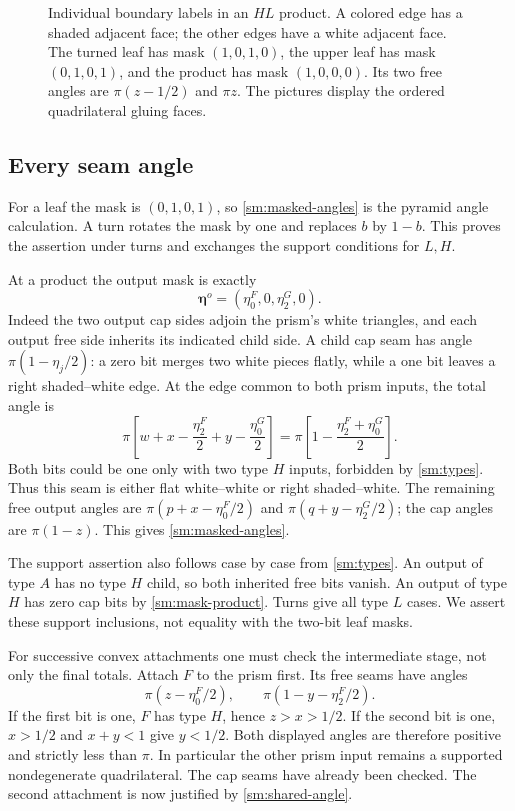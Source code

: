 \begin{figure}[ht]
\centering
\caption{Individual boundary labels in an $HL$ product. A colored
edge has a shaded adjacent face; the other edges have a white
adjacent face. The turned leaf has mask $(1,0,1,0)$, the upper
leaf has mask $(0,1,0,1)$, and the product has mask $(1,0,0,0)$.
Its two free angles are $\pi(z-1/2)$ and $\pi z$.
The pictures display the ordered quadrilateral gluing faces.}
\label{sm:mask-figure}
\end{figure}

\subsection{Every seam angle}
For a leaf the mask is $(0,1,0,1)$, so
\eqref{sm:masked-angles} is the pyramid angle calculation.
A turn rotates the mask by one and replaces $b$ by $1-b$.
This proves the assertion under turns and exchanges the support
conditions for $L,H$.

At a product the output mask is exactly
\begin{equation}\label{sm:mask-product}
         \boldsymbol\eta^o=(\eta^F_0,0,\eta^G_2,0).
\end{equation}
Indeed the two output cap sides adjoin the prism's white triangles,
and each output free side inherits its indicated child side.
A child cap seam has angle
$\pi(1-\eta_j/2)$: a zero bit merges two white pieces flatly, while
a one bit leaves a right shaded--white edge.
At the edge common to both prism inputs, the total angle is
\begin{equation}\label{sm:shared-angle}
 \pi\left[w+x-\frac{\eta^F_2}{2}
             +y-\frac{\eta^G_0}{2}\right]
       =\pi\left[1-\frac{\eta^F_2+\eta^G_0}{2}\right].
\end{equation}
Both bits could be one only with two type $H$ inputs, forbidden
by \eqref{sm:types}. Thus this seam is either flat white--white
or right shaded--white. The remaining free output angles are
$\pi(p+x-\eta^F_0/2)$ and $\pi(q+y-\eta^G_2/2)$; the cap
angles are $\pi(1-z)$. This gives \eqref{sm:masked-angles}.

The support assertion also follows case by case from
\eqref{sm:types}. An output of type $A$ has no type $H$ child,
so both inherited free bits vanish. An output of type $H$ has
zero cap bits by \eqref{sm:mask-product}. Turns give all type $L$
cases. We assert these support inclusions, not equality with the
two-bit leaf masks.

For successive convex attachments one must check the intermediate
stage, not only the final totals. Attach $F$ to the prism first.
Its free seams have angles
\[
 \pi(z-\eta^F_0/2),\qquad
 \pi(1-y-\eta^F_2/2).
\]
If the first bit is one, $F$ has type $H$, hence $z>x>1/2$.
If the second bit is one, $x>1/2$ and $x+y<1$ give $y<1/2$.
Both displayed angles are therefore positive and strictly less
than $\pi$. In particular the other prism input remains a
supported nondegenerate quadrilateral. The cap seams have already
been checked. The second attachment is now justified by
\eqref{sm:shared-angle}.

